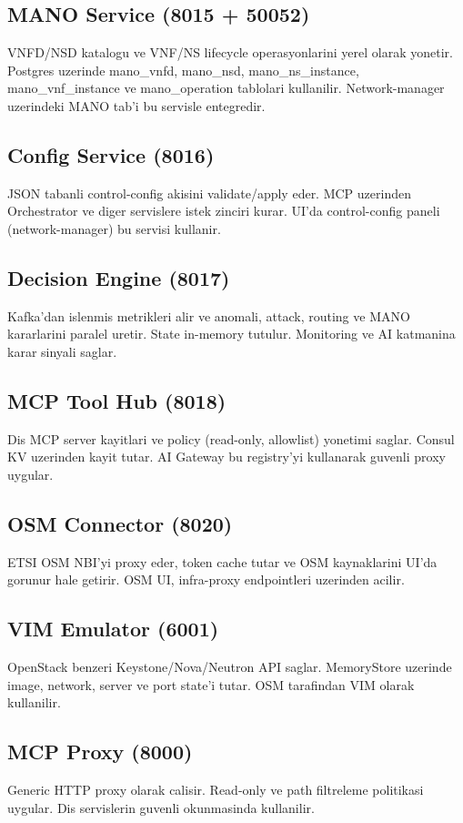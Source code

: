 \documentclass[conference]{IEEEtran}
\begin{document}
\subsection{MANO Service (8015 + 50052)}
VNFD/NSD katalogu ve VNF/NS lifecycle operasyonlarini yerel olarak yonetir. Postgres uzerinde mano_vnfd, mano_nsd, mano_ns_instance, mano_vnf_instance ve mano_operation tablolari kullanilir. Network-manager uzerindeki MANO tab’i bu servisle entegredir.

\subsection{Config Service (8016)}
JSON tabanli control-config akisini validate/apply eder. MCP uzerinden Orchestrator ve diger servislere istek zinciri kurar. UI’da control-config paneli (network-manager) bu servisi kullanir.

\subsection{Decision Engine (8017)}
Kafka’dan islenmis metrikleri alir ve anomali, attack, routing ve MANO kararlarini paralel uretir. State in-memory tutulur. Monitoring ve AI katmanina karar sinyali saglar.

\subsection{MCP Tool Hub (8018)}
Dis MCP server kayitlari ve policy (read-only, allowlist) yonetimi saglar. Consul KV uzerinden kayit tutar. AI Gateway bu registry’yi kullanarak guvenli proxy uygular.

\subsection{OSM Connector (8020)}
ETSI OSM NBI’yi proxy eder, token cache tutar ve OSM kaynaklarini UI’da gorunur hale getirir. OSM UI, infra-proxy endpointleri uzerinden acilir.

\subsection{VIM Emulator (6001)}
OpenStack benzeri Keystone/Nova/Neutron API saglar. MemoryStore uzerinde image, network, server ve port state’i tutar. OSM tarafindan VIM olarak kullanilir.

\subsection{MCP Proxy (8000)}
Generic HTTP proxy olarak calisir. Read-only ve path filtreleme politikasi uygular. Dis servislerin guvenli okunmasinda kullanilir.
\end{document}
